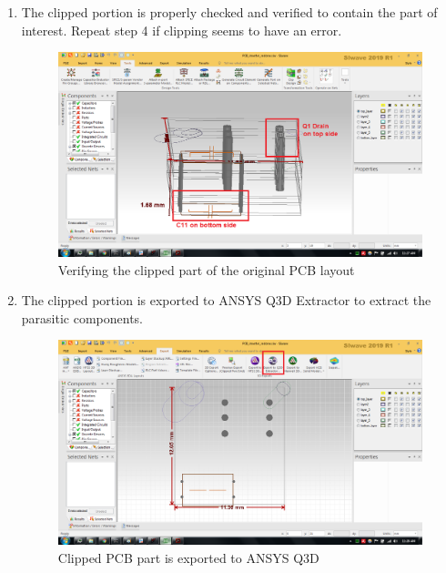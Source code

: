 \begin{enumerate}
\item The clipped portion is properly checked and verified to contain the part of interest. Repeat step 4 if clipping seems to have an error.

\begin{figure} [H]
  \centering
  \includegraphics[width=\linewidth]{pictures/examples/siwave_clipped_side.png}
  \caption{Verifying the clipped part of the original PCB layout}
  \label{fig:PCB_verified}
\end{figure}

\item The clipped portion is exported to ANSYS Q3D Extractor to extract the parasitic components.

\begin{figure} [H]
  \centering
  \includegraphics[width=\linewidth]{pictures/examples/siwave_export_q3d.png}
  \caption{Clipped PCB part is exported to ANSYS Q3D}
  \label{fig:siwave_q3d}
\end{figure}


\end{enumerate}
